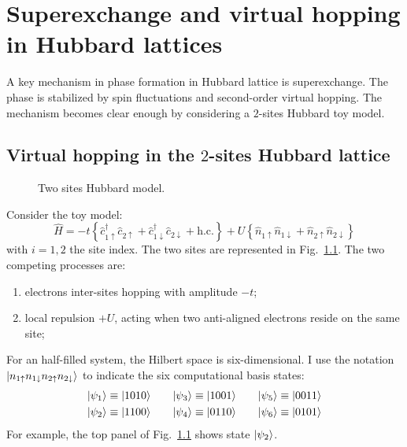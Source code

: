 \chapter{Superexchange and virtual hopping in Hubbard lattices}\label{appendix:superexchange-virtual-hopping}

A key mechanism in \AF phase formation in Hubbard lattice is superexchange. The \AF phase is stabilized by spin fluctuations and second-order virtual hopping. The mechanism becomes clear enough by considering a $2$-sites Hubbard toy model.

\section{Virtual hopping in the $2$-sites Hubbard lattice}

\begin{figure}
	\centering
	
	\caption{Two sites Hubbard model.}
	\label{appfig:two-sites-hubbard-model}
\end{figure}

Consider the toy model:
\[
	\hat H = 
	-t \left\lbrace \hat c_{1\uparrow}^\dagger \hat c_{2\uparrow} + \hat c_{1\downarrow}^\dagger \hat c_{2\downarrow} + \mathrm{h}.\mathrm{c}. \right\rbrace
	+ U \left\lbrace \hat n_{1\uparrow} \hat n_{1\downarrow} + \hat n_{2\uparrow} \hat n_{2\downarrow} \right\rbrace
\]
with $i=1,2$ the site index. The two sites are represented in Fig.~\ref{appfig:two-sites-hubbard-model}. The two competing processes are: 
\begin{enumerate}
	\item electrons inter-sites hopping with amplitude $-t$;
	\item local repulsion $+U$, acting when two anti-aligned electrons reside on the same site; 
\end{enumerate}

For an half-filled system, the Hilbert space is six-dimensional. I use the notation $\ket{n_{1\uparrow} n_{1\downarrow} n_{2\uparrow} n_{2\downarrow}}$ to indicate the six computational basis states:
\[
\begin{aligned}
	\ket{\psi_1} &\equiv \ket{1010} \\
	\ket{\psi_2} &\equiv \ket{1100} \\
\end{aligned}
\qquad
\begin{aligned}
	\ket{\psi_3} &\equiv \ket{1001} \\
	\ket{\psi_4} &\equiv \ket{0110} \\
\end{aligned}
\qquad
\begin{aligned}
	\ket{\psi_5} &\equiv \ket{0011} \\
	\ket{\psi_6} &\equiv \ket{0101} \\
\end{aligned}
\]
For example, the top panel of Fig.~\ref{appfig:two-sites-hubbard-model} shows state $\ket{\psi_2}$. 

